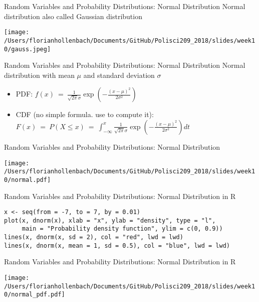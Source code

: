 \documentclass[presentation]{beamer}
\begin{document}
\begin{frame}[label={sec:orgdf25fc8}]{Random Variables and Probability Distributions: Normal Distribution}
\alert{Normal distribution} also called \alert{Gaussian distribution}


\begin{center}
\texttt{[image: /Users/florianhollenbach/Documents/GitHub/Polisci209\_2018/slides/week10/gauss.jpeg]}
\end{center}
\end{frame}

\begin{frame}[label={sec:orgad24253}]{Random Variables and Probability Distributions: Normal Distribution}
\alert{Normal distribution} with mean \(\mu\) and standard deviation \(\sigma\)
\begin{itemize}
\item \alert{PDF}:
\(f(x) \ = \ \frac{1}{\sqrt{2\pi} \sigma}\exp\left(-\frac{(x - \mu)^2}{2\sigma^2}\right)\)

\item \alert{CDF} (no simple formula. use \R{} to compute it):
\(F(x) \ = \ P(X \le x) \ = \ \int_{-\infty}^x
   \frac{1}{\sqrt{2\pi}\sigma}\exp\left(-\frac{(x - \mu)^2}{2\sigma^2}\right) dt\)
\end{itemize}
\end{frame}



\begin{frame}[label={sec:orgc18bf23}]{Random Variables and Probability Distributions: Normal Distribution}
\begin{center}
\texttt{[image: /Users/florianhollenbach/Documents/GitHub/Polisci209\_2018/slides/week10/normal.pdf]}
\end{center}
\end{frame}


\begin{frame}[fragile,shrink=30,label={sec:orgbca1ae9}]{Random Variables and Probability Distributions: Normal Distribution in R}
 \begin{verbatim}
x <- seq(from = -7, to = 7, by = 0.01)
plot(x, dnorm(x), xlab = "x", ylab = "density", type = "l",
     main = "Probability density function", ylim = c(0, 0.9))
lines(x, dnorm(x, sd = 2), col = "red", lwd = lwd)
lines(x, dnorm(x, mean = 1, sd = 0.5), col = "blue", lwd = lwd)
\end{verbatim}
\end{frame}


\begin{frame}[label={sec:org118258f}]{Random Variables and Probability Distributions: Normal Distribution in R}
\begin{center}
\texttt{[image: /Users/florianhollenbach/Documents/GitHub/Polisci209\_2018/slides/week10/normal\_pdf.pdf]}
\end{center}
\end{frame}
\end{document}
